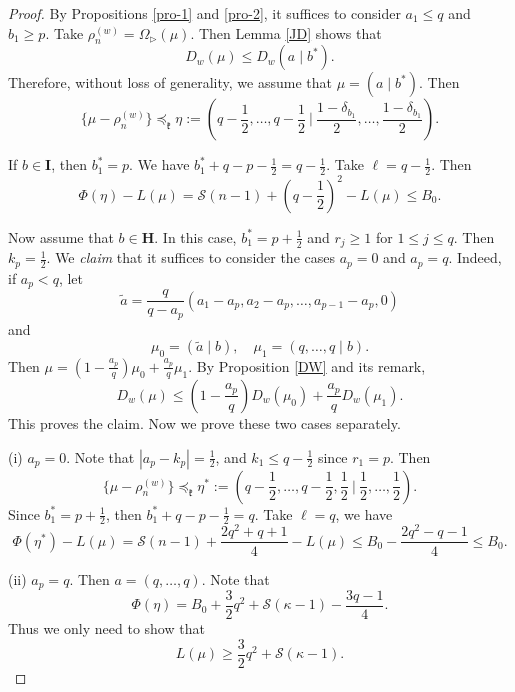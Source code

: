 \documentclass[11pt]{amsart}
\theoremstyle{plain}
\theoremstyle{definition}
\newcommand{\mfk}{\mathfrak{k}}
\newcommand{\caS}{\mathcal{S}}
\begin{document}
\begin{proof}
	By Propositions \ref{pro-1} and \ref{pro-2}, it suffices to consider $a_1\le q$ and $b_1\ge p$. Take $\rho_n^{(w)}=\Omega_{\rhd}(\mu)$. Then Lemma \ref{JD} shows that
	\[D_w(\mu)\le D_w(a\mid b^*).\]
	Therefore, without loss of generality, we assume that $\mu=(a\mid b^*)$. Then
	\[\{\mu-\rho_n^{(w)}\}\preceq_\mfk \eta :=\left(q-\dfrac{1}{2},\dots,q-\dfrac{1}{2}\ \bigg|\ \frac{1-\delta_{b_1}}{2},\dots,\frac{1-\delta_{b_1}}{2}\right).\]
	
	If $b\in \textbf{I}$, then $b_1^*=p$. We have $b_1^*+q-p-\frac{1}{2}=q-\frac{1}{2}$. Take $\ell=q-\frac{1}{2}$. Then
	\[\Phi(\eta)-L(\mu)=\caS(n-1)+\left(q-\frac{1}{2}\right)^2-L(\mu)\le B_0.\]
	
	Now assume that $b\in \textbf{H}$. In this case, $b_1^*=p+\frac{1}{2}$ and $r_j\ge 1$ for $1\le j\le q$. Then $k_p=\frac{1}{2}$. We \emph{claim} that it suffices to consider the cases $a_p=0$ and $a_p=q$. Indeed, if $a_p<q$, let
	\[\widetilde{a}=\frac{q}{q-a_p}\left(a_1-a_p, a_2-a_p, \dots, a_{p-1}-a_p, 0\right)\]
	and
	\[\mu_0=(\widetilde{a}\mid b),\quad \mu_1=(q,\dots,q\mid b).\]
	Then $\mu=(1-\frac{a_p}{q})\mu_0+\frac{a_p}{q}\mu_1$. By Proposition \ref{DW} and its remark,
	\[D_w(\mu)\le \left(1-\frac{a_p}{q}\right)D_w(\mu_0)+\frac{a_p}{q}D_w(\mu_1).\]
	This proves the claim. Now we prove these two cases separately.
	
	(i) $a_p=0$. Note that $|a_p-k_p|=\frac{1}{2}$, and $k_1\le q-\frac{1}{2}$ since $r_1=p$. Then
	\[\{\mu-\rho_n^{(w)}\}\preceq_\mfk\eta^* :=\left(q-\frac{1}{2},\dots,q-\frac{1}{2},\frac{1}{2}\ \bigg|\  \frac{1}{2},\dots,\frac{1}{2}\right).\]
	Since $b_1^*=p+\frac{1}{2}$, then $b_1^*+q-p-\frac{1}{2}=q$. Take $\ell=q$, we have
	\[\Phi(\eta^*)-L(\mu)=\caS(n-1)+\frac{2q^2+q+1}{4}-L(\mu)\le B_0-\frac{2q^2-q-1}{4}\le B_0.\]
	
	(ii) $a_p=q$. Then $a=(q,\dots,q)$. Note that
	\[\Phi(\eta)=B_0+\frac{3}{2}q^2+\caS(\kappa-1)-\frac{3q-1}{4}.\]
	Thus we only need to show that
	\[L(\mu)\ge \frac{3}{2}q^2+\caS(\kappa-1).\]
	

\end{proof}
\end{document}
